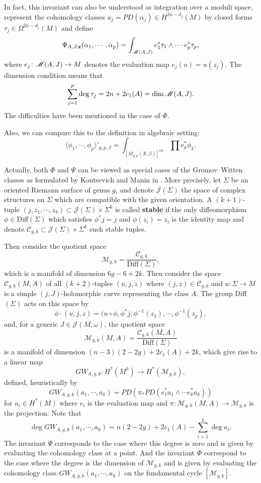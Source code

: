 \documentclass[twoside]{article}
\begin{document}
In fact, this invariant can also be understood as integration over a moduli space, 
represent the cohomology classes $a_j=\mathit{PD}(\alpha_j)\in H^{2n-d_j}(M)$ 
by closed forms $\tau_j\in \Omega^{2n-d_j}(M)$ and define
\[\Psi_{A,J,\mathbf{z}}(\alpha_1,\cdots,\alpha_p)=\int_{\mathscr{M}(A,J)}e_1^*\tau_1\wedge\cdots e_p^*\tau_p,\]
where $e_j\colon \mathscr{M}(A,J)\rightarrow M$ denotes the evaluation map $e_j(u)=u(z_j)$. 
The dimension condition means that
\[\sum_{j=1}^p\deg \tau_j=2n+2c_1(A)=\dim\mathscr{M}(A,J).\]
The difficulties have been mentioned in the case of $\Phi$.

Also, we can compare this to the definition in algebraic setting:
\[\langle \phi_1,\cdots,\phi_p \rangle'_{g,p,\beta}=\int_{\left[\overline{M}_{g,p}(X,\beta)\right]^{\mathrm{vir}}} \prod e_k^*\phi_k.\]

Actually, both $\Phi$ and $\Psi$ can be viewed as 
special cases of the Gromov--Witten classes as formulated by Kontsevich and Manin in \cite{kontsevich-manin}.
More precisely, let $\Sigma$ be an oriented Riemann surface of genus $g$, 
and denote $\mathscr{J}(\Sigma)$ the space of complex structures on $\Sigma$ 
which are compatible with the given orientation. 
A $(k+1)$-tuple $(j,z_1,\cdots,z_k)\subset \mathscr{J}(\Sigma)\times\Sigma^k$ is called \textbf{stable} 
if the only diffeomorphism $\phi\in$Diff$(\Sigma)$ which satisfies $\phi^*j=j$ 
and $\phi(z_i)=z_i$ is the identity map and denote 
$\mathscr{C}_{g,k}\subset\mathscr{J}(\Sigma)\times\Sigma^k $ such stable tuples.

Then consider the quotient space
\[\mathscr{M}_{g,k}=\frac{\mathscr{C}_{g,k}}{\mathrm{Diff}(\Sigma)},\]
which is a manifold of dimension $6g-6+2k$. Then consider the space
$\mathscr{C}_{g,k}(M,A)$ of all $(k+2)$-tuples $(u,j,z)$ where 
$(j,z)\in \mathscr{C}_{g,k}$ and $u\colon \Sigma\rightarrow M$ is a simple 
$(j,J)$-holomorphic curve representing the class $A$. 
The group Diff$(\Sigma)$ acts on this space by
\[\phi\cdot (u,j,z)=(u\circ\phi,\phi^*j,\phi^{-1}(z_1),\cdots,\phi^{-1}(z_p),\]
and, for a generic $J\in\mathscr{J}(M,\omega)$, the quotient space
\[\mathscr{M}_{g,k}(M,A)=\frac{\mathscr{C}_{g,k}(M,A)}{\mathrm{Diff}(\Sigma)}\]
is a manifold of dimension $(n-3)(2-2g)+2c_1(A)+2k$, which give rise to a linear map
\[\mathit{GW}_{A,g,k}\colon H^*(M^k)\rightarrow H^*(\mathscr{M}_{g,k}),\]
defined, heuristically by
\[\mathit{GW}_{A,g,k}(a_1,\cdots,a_k)=\mathit{PD}(\pi_*\mathit{PD}(e_1^*a_1\wedge\cdots e_k^*a_k))\]
for $a_i\in H^*(M)$ where $e_i$ is the evaluation map and $\pi\colon \mathscr{M}_{g,k}(M,A)\rightarrow \mathscr{M}_{g,k}$ is the projection. 
Note that 
\[\deg \mathit{GW}_{A,g,k}(a_1,\cdots,a_k)=n(2-2g)+2c_1(A)-\sum_{i=1}^{k}\deg a_i.\]
The invariant $\Psi$ corresponds to the case where this degree is zero and is given by 
evaluating the cohomology class at a point. 
And the invariant $\Phi$ correspond to the case where the degree is the dimension of $\mathscr{M}_{g,k}$ 
and is given by evaluating the cohomology class $\mathit{GW}_{A,g,k}(a_1,\cdots,a_k)$ 
on the fundamental cycle $\left[ \mathscr{M}_{g,k} \right]$.

\printbibliography
\end{document}
